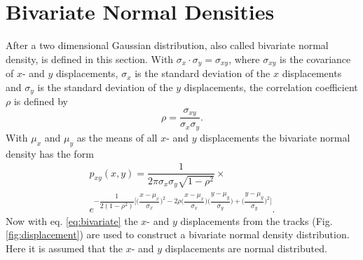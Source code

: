 \documentclass[11pt,twoside,a4paper,fleqn,x11names]{report}
\numberwithin{equation}{chapter}
\numberwithin{figure}{chapter}
\numberwithin{table}{chapter}
\begin{document}
\section{Bivariate Normal Densities}
\label{subsec:bivar}
After \cite{duda} a two dimensional Gaussian distribution, also called bivariate normal density, is defined in this section.
With $\sigma_x \cdot\sigma_y = \sigma_{xy}$, where $\sigma_{xy}$ is the covariance of $x$- and $y$ displacements, $\sigma_{x}$ is the standard deviation of the $x$ displacements and $\sigma_{y}$ is the standard deviation of the $y$ displacements, the correlation coefficient $\rho$ is defined by
\begin{equation}
	\rho = \dfrac{\sigma_{xy}}{\sigma_x\sigma_y}.
\end{equation}
With $\mu_x$ and $\mu_y$ as the means of all $x$- and $y$ displacements the bivariate normal density has the form
\begin{equation}
	\begin{multlined}
		p_{xy}(x,y)=\dfrac{1}{2\pi\sigma_x\sigma_y\sqrt{1-\rho^2}} \times \\ e^{-\dfrac{1}{2(1-\rho^2)}\bigg[\bigg(\dfrac{x-\mu_x}{\sigma_x}\bigg)^2-2\rho\bigg(\dfrac{x-\mu_x}{\sigma_x}\bigg)\bigg(\dfrac{y-\mu_y}{\sigma_y}\bigg)+\bigg(\dfrac{y-\mu_y}{\sigma_y}\bigg)^2\bigg]}.
	\end{multlined}
	\label{eq:bivariate}
\end{equation}
Now with eq. \ref{eq:bivariate} the $x$- and $y$ displacements from the tracks (Fig. \ref{fig:displacement}) are used to construct a bivariate normal density distribution. Here it is assumed that the $x$- and $y$ displacements are normal distributed.
\end{document}
